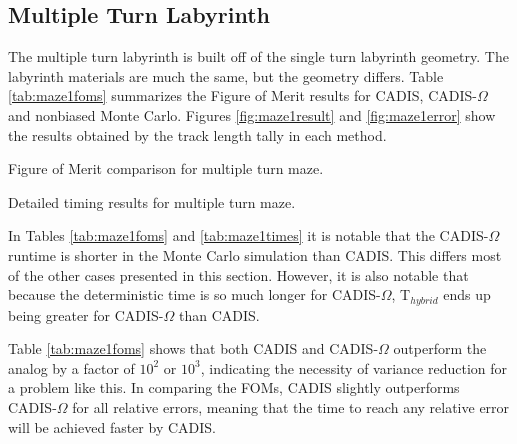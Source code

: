 \subsection{Multiple Turn Labyrinth}
\label{subsec:maze1}

The multiple turn labyrinth is built off of the single turn labyrinth geometry.
The labyrinth materials are much the same, but the geometry differs. Table
\ref{tab:maze1foms} summarizes the Figure of Merit results for CADIS,
CADIS-$\Omega$ and nonbiased Monte Carlo. Figures \ref{fig:maze1result} and
\ref{fig:maze1error} show the results obtained by the track length tally in each
method.

\begin{table}[h!]
  \centering
  
  \caption[Figure of Merit comparison for multiple turn maze.]{Figure of Merit
    comparison for multiple turn maze.}
  \label{tab:maze1foms}
\end{table}

\begin{table}[h!]
  \centering
  
  \caption[Detailed timing results for multiple turn maze.]
  {Detailed timing results for multiple turn maze.}
  \label{tab:maze1times}
\end{table}

In Tables \ref{tab:maze1foms} and \ref{tab:maze1times}
it is notable that the CADIS-$\Omega$ runtime is
shorter in the Monte Carlo simulation than CADIS. This differs most of the other
cases presented in this section. However, it is also notable that because the
deterministic time is so much longer for CADIS-$\Omega$, T$_{hybrid}$ ends up
being greater for CADIS-$\Omega$ than CADIS.

Table \ref{tab:maze1foms} shows that both CADIS and CADIS-$\Omega$ outperform the
analog by a factor of $10^2$ or $10^3$, indicating the necessity of variance
reduction for a problem like this. In comparing the FOMs, CADIS slightly outperforms
CADIS-$\Omega$ for all relative errors, meaning that the time
to reach any relative error will be achieved faster by CADIS.

